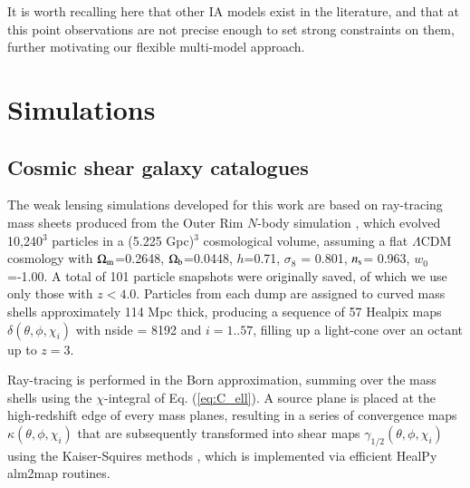 \documentclass[useAMS,usenatbib]{mn2e}
\begin{document}
It is worth recalling here that other IA models exist in the literature, and that at this point observations are not precise enough to set strong constraints on them, further motivating our flexible multi-model approach.  




\section{Simulations}
\label{sec:sims}

\subsection{Cosmic shear galaxy catalogues} 
\label{subsec:WL_cats}

The weak lensing simulations developed for this work are based on ray-tracing mass sheets produced from the Outer Rim $N$-body simulation \citep{OuterRim}, which evolved 10,240$^3$ particles in a (5.225 Gpc)$^3$ cosmological volume, assuming a flat $\Lambda$CDM cosmology with $\Omega_{\rm m}$=0.2648, $\Omega_{\rm b}$=0.0448, $h$=0.71, $\sigma_8$ = 0.801, $n_{\rm s}$= 0.963, $w_0$=-1.00. A total of 101 particle snapshots were originally saved, of which we use only those with $z<4.0$. Particles from each dump are assigned to curved mass shells approximately 114 Mpc thick, producing a sequence of 57 {\sc Healpix} maps $\delta(\theta,\phi,\chi_i)$ with {\sc nside} = 8192 and $i=1..57$, filling up a light-cone over an octant up to $z=3$. %

Ray-tracing is performed in the Born approximation, summing over the mass shells using the $\chi$-integral of Eq. (\ref{eq:C_ell}). A source plane is placed at the high-redshift edge of every mass planes, resulting in a series of convergence  maps  $\kappa(\theta,\phi,\chi_i)$ that are subsequently transformed into shear maps $\gamma_{1/2}(\theta,\phi,\chi_i)$ using the Kaiser-Squires methods \citep{KaiserSquires}, which is implemented via efficient {\sc HealPy alm2map} routines.
\end{document}
